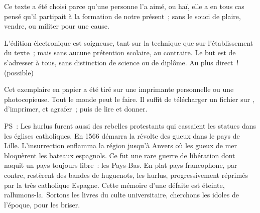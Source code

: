 \documentclass[french,twoside]{book} %
\newif\ifdev
\renewcommand{\LettrineFontHook}{\color{rubric}}
\newcommand{\initialiv}[2]{%
  \let\oldLFH\LettrineFontHook
  \IfSubStr{QJ’}{#1}{
    \lettrine[lines=4, lhang=0.2, loversize=-0.1, lraise=0.2]{\smash{#1}}{#2}
  }{\IfSubStr{É}{#1}{
    \lettrine[lines=4, lhang=0.2, loversize=-0, lraise=0]{\smash{#1}}{#2}
  }{\IfSubStr{ÀÂ}{#1}{
    \lettrine[lines=4, lhang=0.2, loversize=-0, lraise=0, slope=0.6em]{\smash{#1}}{#2}
  }{\IfSubStr{A}{#1}{
    \lettrine[lines=4, lhang=0.2, loversize=0.2, slope=0.6em]{\smash{#1}}{#2}
  }{\IfSubStr{V}{#1}{
    \lettrine[lines=4, lhang=0.2, loversize=0.2, slope=-0.5em]{\smash{#1}}{#2}
  }{
    \lettrine[lines=4, lhang=0.2, loversize=0.2]{\smash{#1}}{#2}
  }}}}}
  \let\LettrineFontHook\oldLFH
}
\renewcommand{\LettrineFontHook}{\bfseries\color{rubric}}
\begin{document}
  Ce texte a été choisi parce qu’une personne l’a aimé,
  ou haï, elle a en tous cas pensé qu’il partipait à la formation de notre présent ;
  sans le souci de plaire, vendre, ou militer pour une cause.
  \par

  L’édition électronique est soigneuse, tant sur la technique
  que sur l’établissement du texte ; mais sans aucune prétention scolaire, au contraire.
  Le but est de s’adresser à tous, sans distinction de science ou de diplôme.
  Au plus direct ! (possible)
  \par

  Cet exemplaire en papier a été tiré sur une imprimante personnelle
   ou une photocopieuse. Tout le monde peut le faire.
  Il suffit de
  télécharger un fichier sur \href{https://hurlus.fr}{},
  d’imprimer, et agrafer ; puis de lire et donner.\par

  \bigskip

  \noindent PS : Les hurlus furent aussi des rebelles protestants qui cassaient les statues dans les églises catholiques. En 1566 démarra la révolte des gueux dans le pays de Lille. L’insurrection enflamma la région jusqu’à Anvers où les gueux de mer bloquèrent les bateaux espagnols.
  Ce fut une rare guerre de libération dont naquit un pays toujours libre : les Pays-Bas.
  En plat pays francophone, par contre, restèrent des bandes de huguenots, les hurlus, progressivement réprimés par la très catholique Espagne.
  Cette mémoire d’une défaite est éteinte, rallumons-la. Sortons les livres du culte universitaire, cherchons les idoles de l’époque, pour les briser.
\fi

\ifdev %
\fontname\font — \textsc{Les règles du jeu}\par
(\hyperref[utopie]{\underline{Lien}})\par
\noindent \initialiv{A}{lors là}\blindtext\par
\noindent \initialiv{À}{ la bonheur des dames}\blindtext\par
\noindent \initialiv{É}{tonnez-le}\blindtext\par
\noindent \initialiv{Q}{ualitativement}\blindtext\par
\noindent \initialiv{V}{aloriser}\blindtext\par
\Blindtext
\phantomsection
\label{utopie}
\Blinddocument
\fi
\end{document}

